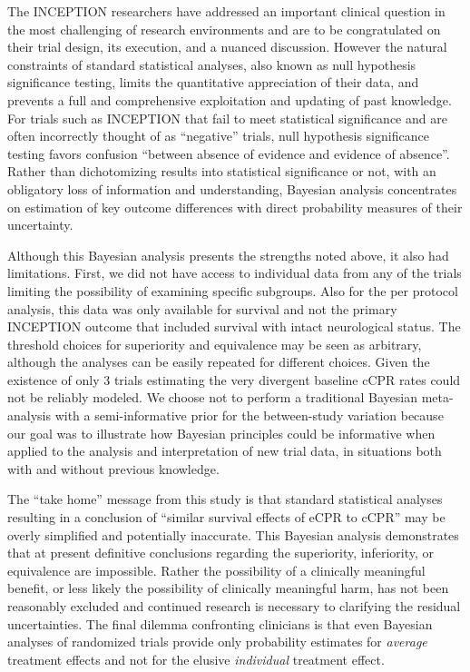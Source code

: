 \documentclass[
  super,
  preprint,
  3p]{elsarticle}
\begin{document}
The INCEPTION\citep{CPR2023a} researchers have addressed an important
clinical question in the most challenging of research environments and
are to be congratulated on their trial design, its execution, and a
nuanced discussion. However the natural constraints of standard
statistical analyses, also known as null hypothesis significance
testing, limits the quantitative appreciation of their data, and
prevents a full and comprehensive exploitation and updating of past
knowledge. For trials such as INCEPTION\citep{CPR2023a} that fail to
meet statistical significance and are often incorrectly thought of as
``negative'' trials, null hypothesis significance testing favors
confusion ``between absence of evidence and evidence of
absence''\citep{RN6765}. Rather than dichotomizing results into
statistical significance or not, with an obligatory loss of information
and understanding, Bayesian analysis concentrates on estimation of key
outcome differences with direct probability measures of their
uncertainty.

Although this Bayesian analysis presents the strengths noted above, it
also had limitations. First, we did not have access to individual data
from any of the trials limiting the possibility of examining specific
subgroups. Also for the per protocol analysis, this data was only
available for survival and not the primary INCEPTION\citep{CPR2023a}
outcome that included survival with intact neurological status. The
threshold choices for superiority and equivalence may be seen as
arbitrary, although the analyses can be easily repeated for different
choices. Given the existence of only 3 trials estimating the very
divergent baseline cCPR rates could not be reliably modeled. We choose
not to perform a traditional Bayesian meta-analysis with a
semi-informative prior for the between-study variation because our goal
was to illustrate how Bayesian principles could be informative when
applied to the analysis and interpretation of new trial data, in
situations both with and without previous knowledge.

The ``take home'' message from this study is that standard statistical
analyses resulting in a conclusion of ``similar survival effects of eCPR
to cCPR'' may be overly simplified and potentially inaccurate. This
Bayesian analysis demonstrates that at present definitive conclusions
regarding the superiority, inferiority, or equivalence are impossible.
Rather the possibility of a clinically meaningful benefit, or less
likely the possibility of clinically meaningful harm, has not been
reasonably excluded and continued research is necessary to clarifying
the residual uncertainties. The final dilemma confronting clinicians is
that even Bayesian analyses of randomized trials provide only
probability estimates for \emph{average} treatment effects and not for
the elusive \emph{individual} treatment effect.
\end{document}
